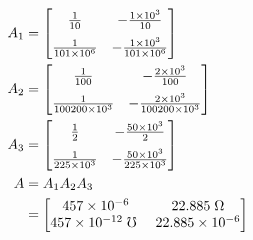 \begin{enumerate}
{	\begin{align*}
	A_1 &= 
	\left[ \begin{matrix}
	\frac{1}{\Aone} 			& -\frac{\Roone}{\Aone} \\[6pt] 
	\frac{1}{\Aone \Rione }		& -\frac{\Roone}{\Aone \Rione}
	\end{matrix}  \right] 
	\\
	A_2 &= 
	\left[ \begin{matrix}
	\frac{1}{\Atwo} 			& -\frac{\Rotwo}{\Atwo} \\[6pt] 
	\frac{1}{\Atwo \Ritwo }		& -\frac{\Rotwo}{\Atwo \Ritwo}
	\end{matrix}  \right] 
	\\
	A_3 &= 
	\left[ \begin{matrix}
	\frac{1}{\Athree} 			& -\frac{\Rothree}{\Athree} \\[6pt] 
	\frac{1}{\Athree \Rithree }	& -\frac{\Rothree}{\Athree \Rithree}
	\end{matrix}  \right] 
	\\
	A &= A_1 A_2 A_3
	\\
	&= \left[ \begin{matrix}
	\Aoneone 			& \Aonetwo \; \Omega \\ 
	\Atwoone \; \mho \	& \Atwotwo
	\end{matrix}  \right] 
	\end{align*}
	\\
	}
\end{enumerate}